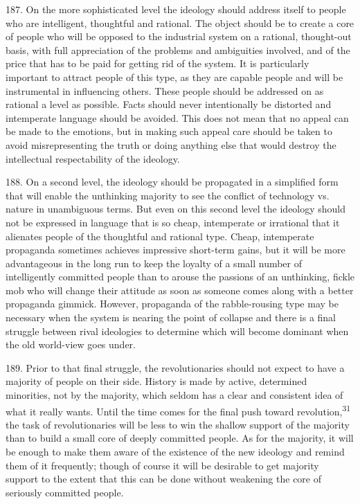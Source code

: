 \documentclass{article}
\begin{document}
187.  On  the  more  sophisticated  level  the  ideology  should  address  itself  to  people  who  are  
intelligent, thoughtful and rational.  The object should be to create a core of people who will be 
opposed  to  the  industrial  system  on  a  rational,  thought-out  basis,  with  full  appreciation  of  the  
problems  and  ambiguities  involved,  and  of  the  price  that  has  to  be  paid  for  getting  rid  of  the  
system.  It is particularly important to attract people of this type, as they are capable people and 
will be instrumental in influencing others.  These people should be addressed on as rational a level 
as  possible.   Facts  should  never  intentionally  be  distorted  and  intemperate  language  should  be  
avoided.   This  does  not  mean  that  no  appeal  can  be  made  to  the  emotions,  but  in  making  such  
appeal care should be taken to avoid misrepresenting the truth or doing anything else that would 
destroy the intellectual respectability of the ideology. \vspace{\baselineskip}

188.  On a second level, the ideology should be propagated in a simplified form that will enable 
the unthinking majority to see the conflict of technology vs. nature in unambiguous terms.  But 
even  on  this  second  level  the  ideology  should  not  be  expressed  in  language  that  is  so  cheap,  
intemperate  or  irrational  that  it  alienates  people  of  the  thoughtful  and  rational  type.   Cheap, 
intemperate  propaganda  sometimes  achieves  impressive  short-term  gains,  but  it  will  be  more  
advantageous  in  the  long  run  to  keep  the  loyalty  of  a  small  number  of  intelligently  committed  
people than to arouse the passions of an unthinking, fickle mob who will change their attitude as 
soon as someone comes along with a better propaganda gimmick.  However, propaganda of the 
rabble-rousing type may be necessary when the system is nearing the point of collapse and there 
is a final struggle between rival ideologies to determine which will become dominant when the old 
world-view goes under. \vspace{\baselineskip}

189.  Prior to that final struggle, the revolutionaries should not expect to have a majority of people 
on their side.  History is made by active, determined minorities, not by the majority, which seldom 
has  a  clear  and  consistent  idea  of  what  it  really  wants.   Until  the  time  comes  for  the  final  push  
toward  revolution,\textsuperscript{31}  the  task  of  revolutionaries  will  be  less  to  win  the  shallow  support  of  the  
majority  than  to  build  a  small  core  of  deeply  committed  people.   As  for  the  majority,  it  will  be  
enough to make them aware of the existence of the new ideology and remind them of it frequently; 
though  of  course  it  will  be  desirable  to  get  majority  support  to  the  extent  that  this  can  be  done  
without weakening the core of seriously committed people. \vspace{\baselineskip} \newpage
\end{document}
